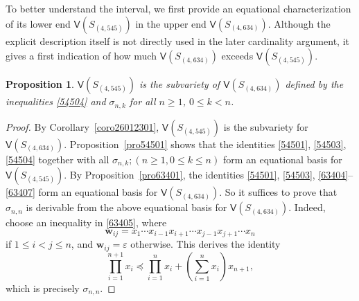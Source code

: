 \documentclass[reqno]{amsart}
\theoremstyle{plain}
\newtheorem{pro}[thm]{Proposition}
\theoremstyle{definition}
\newcommand{\bw}{\mathbf{w}}
\begin{document}
To better understand the interval,
we first provide an equational characterization of its lower end $\mathsf{V}(S_{(4, 545)})$ in the upper end $\mathsf{V}(S_{(4, 634)})$.
Although the explicit description itself is not directly used in the later cardinality argument,
it gives a first indication of how much $\mathsf{V}(S_{(4, 634)})$ exceeds $\mathsf{V}(S_{(4, 545)})$.

\begin{pro}\label{lem05}
$\mathsf{V}(S_{(4, 545)})$ is the subvariety of $\mathsf{V}(S_{(4, 634)})$ defined by the inequalities \eqref{54504} and
$\sigma_{n,k}$ for all $n \geq 1$, $0\leq k<n$.
\end{pro}
\begin{proof}
By Corollary~\ref{coro26012301}, $\mathsf{V}(S_{(4, 545)})$ is the subvariety for $\mathsf{V}(S_{(4, 634)})$.
Proposition~\ref{pro54501} shows that the identities \eqref{54501}, \eqref{54503}, \eqref{54504}
together with all $\sigma_{n,k}; (n \geq 1, 0\leq k\leq n)$
form an equational basis for $\mathsf{V}(S_{(4, 545)})$.
By Proposition~\ref{pro63401}, the identities \eqref{54501}, \eqref{54503}, \eqref{63404}--\eqref{63407}
form an equational basis for $\mathsf{V}(S_{(4, 634)})$.
So it suffices to prove that $\sigma_{n,n}$ is derivable
from the above equational basis for $\mathsf{V}(S_{(4, 634)})$.
Indeed, choose an inequality in \eqref{63405}, where
\[
\bw_{ij}=x_1\cdots x_{i-1}x_{i+1}\cdots x_{j-1}x_{j+1}\cdots x_n
\]
if $1\leq i<j\leq n$,
and $\bw_{ij}=\varepsilon$ otherwise. This derives the identity
\[
\prod_{i=1}^{n+1} x_i \preceq \prod_{i=1}^n x_i+\left(\sum_{i=1}^nx_i\right)x_{n+1},
\]
which is precisely $\sigma_{n,n}$.
\end{proof}
\end{document}
